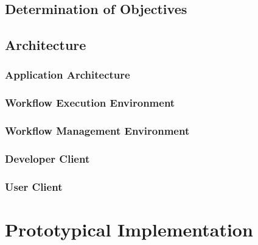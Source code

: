 \documentclass[language=english,noinputenc]{wiwwuwordrprt}
\begin{document}
    \section{Determination of Objectives} %
      \label{sec:determination_of_objectives}
      
    
    \section{Architecture} %
    \label{sec:architecture}
      \subsection{Application Architecture} %
      \label{sub:application_architecture}
      
      \subsection{Workflow Execution Environment} %
      \label{sub:workflow_execution_environment}
      
      \subsection{Workflow Management Environment} %
      \label{sub:workflow_management}
      
      \subsection{Developer Client} %
      \label{sub:developer_client}
      

      \subsection{User Client} %
      \label{sub:user_client}
      
    
  

  \chapter{Prototypical Implementation} %
  \label{cha:implementation}
\end{document}
